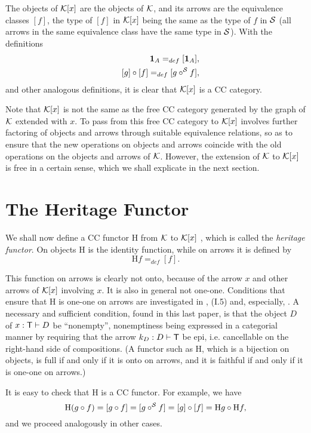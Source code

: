 \documentclass[12pt]{article}
\begin{document}
The objects of ${\cal K}[x]$ are the objects of ${\cal K}$, and its arrows
are the equivalence classes $[f]$, the type of $[f]$ in ${\cal K}[x]$ being
the same as the type of $f$ in ${\cal S}$ (all arrows in the same
equivalence class have the same type in ${\cal S}$). With the definitions 
\begin{eqnarray*}
&&{\bf 1}_{A}=_{def}[{\bf 1}_{A}], \\
&&\,[g]\circ [f]=_{def}[g\circ ^{{\cal S}}f],
\end{eqnarray*}
and other analogous definitions, it is clear that ${\cal K}[x]$ is a CC
category.

Note that ${\cal K}[x]$ is not the same as the free CC category generated by
the graph of ${\cal K}$ extended with $x$. To pass from this free CC
category to ${\cal K}[x]$ involves further factoring of objects and arrows
through suitable equivalence relations, so as to ensure that the new
operations on objects and arrows coincide with the old operations on the
objects and arrows of ${\cal K}$. However, the extension of ${\cal K}$ to $%
{\cal K}[x]$ is free in a certain sense, which we shall explicate in the
next section.

\section{The Heritage Functor}

\noindent We shall now define a CC functor H from ${\cal K}$ to ${\cal K}[x]$%
, which is called the {\it heritage functor}. On objects H is the identity
function, while on arrows it is defined by 
\[
\text{H}f=_{def}[f]. 
\]

This function on arrows is clearly not onto, because of the arrow $x$ and
other arrows of ${\cal K}[x]$ involving $x$. It is also in general not
one-one. Conditions that ensure that H is one-one on arrows are investigated
in \cite{Lam74}, \cite{LS86} (I.5) and, especially, \cite{Cub98}. A
necessary and sufficient condition, found in this last paper, is that the
object $D$ of $x:{\sf T}\vdash D$ be ``nonempty'', nonemptiness being
expressed in a categorial manner by requiring that the arrow $k_{D}:D\vdash 
{\sf T}$ be epi, i.e. cancellable on the right-hand side of compositions. (A
functor such as H, which is a bijection on objects, is full if and only if
it is onto on arrows, and it is faithful if and only if it is one-one on
arrows.)

It is easy to check that H is a CC functor. For example, we have 
\[
\text{H}(g\circ f)=[g\circ f]=[g\circ ^{{\cal S}}f]=[g]\circ [f]=\text{H}%
g\circ \text{H}f, 
\]
and we proceed analogously in other cases.
\end{document}
